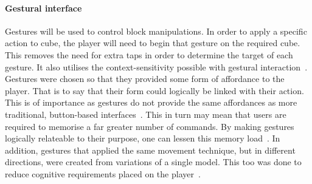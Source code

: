 \paragraph{Gestural interface}
Gestures will be used to control block manipulations. In order to apply a specific action to cube, the player will need to begin that gesture on the required cube. This removes the need for extra taps in order to determine the target of each gesture. It also utilises the context-sensitivity possible with gestural interaction~\citep{Wobb09}. Gestures were chosen so that they provided some form of affordance to the player. That is to say that their form could logically be linked with their action. This is of importance as gestures do not provide the same affordances as more traditional, button-based interfaces~\citep{Niel04}. This in turn may mean that users are required to memorise a far greater number of commands. By making gestures logically relateable to their purpose, one can lessen this memory load~\citep{Jaim07}. In addition, gestures that applied the same movement technique, but in different directions, were created from variations of a single model. This too was done to reduce cognitive requirements placed on the player~\citep{Niel04}.

